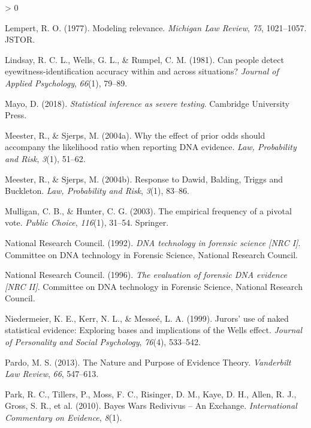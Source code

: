 \documentclass[
  10pt,
  dvipsnames,enabledeprecatedfontcommands]{scrartcl}
\newlength{\cslhangindent}
\newenvironment{CSLReferences}[2] %
 {%
  \setlength{\parindent}{0pt}
  \ifodd #1 \everypar{\setlength{\hangindent}{\cslhangindent}}\ignorespaces\fi
  \ifnum #2 > 0
  \setlength{\parskip}{#2\baselineskip}
  \fi
 }%
 {}
\begin{document}
\begin{CSLReferences}{1}{0}
\leavevmode\hypertarget{ref-lempert1977modeling}{}%
Lempert, R. O. (1977). Modeling relevance. \emph{Michigan Law Review},
\emph{75}, 1021--1057. JSTOR.

\leavevmode\hypertarget{ref-Lindsay1981CanPeopleDetect}{}%
Lindsay, R. C. L., Wells, G. L., \& Rumpel, C. M. (1981). Can people
detect eyewitness-identification accuracy within and across situations?
\emph{Journal of Applied Psychology}, \emph{66}(1), 79--89.

\leavevmode\hypertarget{ref-mayo2018}{}%
Mayo, D. (2018). \emph{Statistical inference as severe testing}.
Cambridge University Press.

\leavevmode\hypertarget{ref-meester2004WhyEffectPriora}{}%
Meester, R., \& Sjerps, M. (2004a). Why the effect of prior odds should
accompany the likelihood ratio when reporting {DNA} evidence. \emph{Law,
Probability and Risk}, \emph{3}(1), 51--62.

\leavevmode\hypertarget{ref-meester2004ResponseDawidBalding}{}%
Meester, R., \& Sjerps, M. (2004b). Response to {Dawid}, {Balding},
{Triggs} and {Buckleton}. \emph{Law, Probability and Risk}, \emph{3}(1),
83--86.

\leavevmode\hypertarget{ref-mulligan2003empirical}{}%
Mulligan, C. B., \& Hunter, C. G. (2003). The empirical frequency of a
pivotal vote. \emph{Public Choice}, \emph{116}(1), 31--54. Springer.

\leavevmode\hypertarget{ref-NRCI1992}{}%
National Research Council. (1992). \emph{{DNA} technology in forensic
science {\emph{{[}NRC I{]}}}}. Committee on {DNA} technology in
{F}orensic {S}cience, {N}ational {R}esearch {C}ouncil.

\leavevmode\hypertarget{ref-NRCII1996}{}%
National Research Council. (1996). \emph{The evaluation of forensic
{DNA} evidence {\emph{{[}NRC II{]}}}}. Committee on {DNA} technology in
{F}orensic {S}cience, {N}ational {R}esearch {C}ouncil.

\leavevmode\hypertarget{ref-niedermeierEtAl1999}{}%
Niedermeier, K. E., Kerr, N. L., \& Messeé, L. A. (1999). Jurors' use of
naked statistical evidence: Exploring bases and implications of the
{Wells} effect. \emph{Journal of Personality and Social Psychology},
\emph{76}(4), 533--542.

\leavevmode\hypertarget{ref-pardo2013NaturePurposeEvidence}{}%
Pardo, M. S. (2013). The {Nature} and {Purpose} of {Evidence Theory}.
\emph{Vanderbilt Law Review}, \emph{66}, 547--613.

\leavevmode\hypertarget{ref-park2010BayesWarsRedivivus}{}%
Park, R. C., Tillers, P., Moss, F. C., Risinger, D. M., Kaye, D. H.,
Allen, R. J., Gross, S. R., et al. (2010). Bayes {Wars Redivivus} -- {An
Exchange}. \emph{International Commentary on Evidence}, \emph{8}(1).


\end{CSLReferences}
\end{document}
